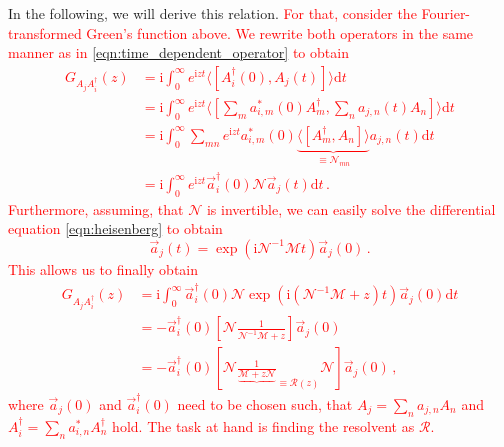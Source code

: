 \documentclass[
    reprint, 
    aps,
    preprintnumbers,
    twocolumn,
    prb,
    superscriptaddress
]{revtex4-2}
\newcommand{\im}{\mathrm{i}}
\newcommand{\mM}{\mathcal{M}}
\newcommand{\mN}{\mathcal{N}}
\newcommand{\markEdited}{red}
\begin{document}
In the following, we will derive this relation.
\textcolor{\markEdited}{For that, consider the Fourier-transformed Green's function above.
We rewrite both operators in the same manner as in \eqref{eqn:time_dependent_operator} to obtain
\begin{align}
    G_{A_j A_i^\dagger} (z) &= \im \int_0^\infty e^{\im z t} \langle [ A_i^\dagger(0), A_j(t) ] \rangle \mathrm{d}t \nonumber \\
        &= \im \int_0^\infty e^{\im z t} \langle [ \sum_m a_{i,m}^*(0) A_m^\dagger, \sum_n a_{j,n}(t) A_n ] \rangle \mathrm{d}t \nonumber \\
        &= \im \int_0^\infty \sum_{mn} e^{\im z t} a_{i,m}^*(0) \underbrace{\langle [ A_m^\dagger, A_n ] \rangle}_{\equiv \mN_{mn}} a_{j,n}(t) \mathrm{d}t \nonumber \\
        &= \im \int_0^\infty e^{\im z t} \vec{a}_{i}^\dagger (0) \mN \vec{a}_{j}(t) \mathrm{d}t\,.
\end{align}
Furthermore, assuming, that $\mN$ is invertible, we can easily solve the differential equation \eqref{eqn:heisenberg} to obtain
\begin{equation}
    \vec{a}_{j}(t) = \exp \left( \im \mN^{-1} \mM t \right) \vec{a}_{j}(0)\,.
\end{equation}
This allows us to finally obtain
\begin{align}
    \label{eqn:green_derivation}
    G_{A_j A_i^\dagger} (z) &= \im  \int_0^\infty \vec{a}_{i}^\dagger (0) \mN \exp \left( \im \left(\mN^{-1} \mM + z \right) t \right) \vec{a}_{j}(0) \mathrm{d}t  \nonumber \\
        &= - \vec{a}_{i}^\dagger (0) \left[ \mN \frac{1}{\mN^{-1} \mM + z} \right] \vec{a}_{j}(0) \nonumber \\
        &= - \vec{a}_{i}^\dagger (0) \left[ \mN \frac{1}{ \underbrace{\mM + z \mN}}_{\equiv \mathcal{R}(z)} \mN \right] \vec{a}_{j}(0)\,,
\end{align}
where $\vec{a}_j(0)$ and $\vec{a}_i^\dagger (0)$ need to be chosen such, that $A_j = \sum_n a_{j,n} A_n$ and $A_i^\dagger = \sum_n a_{i,n}^* A_n^\dagger$ hold.
The task at hand is finding the resolvent as $\mathcal{R}$.}
\end{document}
